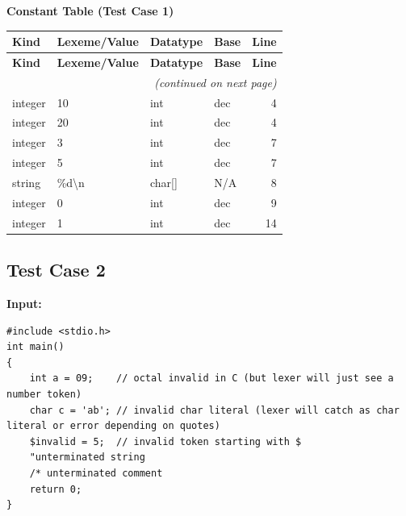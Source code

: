 \documentclass[12pt,a4paper]{article}
\begin{document}
\noindent\textbf{Constant Table (Test Case 1)}
\begin{center}
\begin{longtable}{@{} l l l l r @{}}\toprule
\textbf{Kind} & \textbf{Lexeme/Value} & \textbf{Datatype} & \textbf{Base} & \textbf{Line} \\
\midrule
\endfirsthead
\toprule
\textbf{Kind} & \textbf{Lexeme/Value} & \textbf{Datatype} & \textbf{Base} & \textbf{Line} \\
\midrule
\endhead
\midrule \multicolumn{5}{r}{\emph{(continued on next page)}}\\
\midrule
\endfoot
\bottomrule
\endlastfoot
integer       & 10           & int     & dec & 4  \\
integer       & 20           & int     & dec & 4  \\
integer       & 3            & int     & dec & 7  \\
integer       & 5            & int     & dec & 7  \\
string        & \%d\textbackslash n & char[]  & N/A & 8  \\
integer       & 0            & int     & dec & 9  \\
integer       & 1            & int     & dec & 14 \\
\end{longtable}
\end{center}

\subsection*{Test Case 2}
\textbf{Input:}
\begin{lstlisting}[style=flex]
#include <stdio.h>
int main()
{
    int a = 09;    // octal invalid in C (but lexer will just see a number token)
    char c = 'ab'; // invalid char literal (lexer will catch as char literal or error depending on quotes)
    $invalid = 5;  // invalid token starting with $
    "unterminated string
    /* unterminated comment
    return 0;
}
\end{lstlisting}
\end{document}
